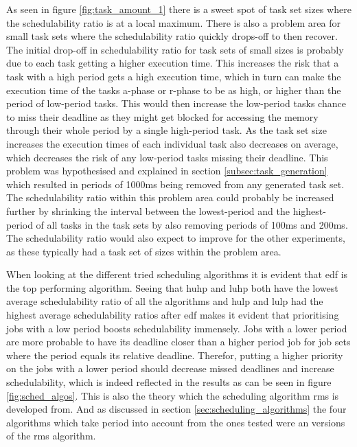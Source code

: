 \documentclass{kththesis}
\begin{document}

As seen in figure \ref{fig:task_amount_1} there is a sweet spot of task set sizes where the
schedulability ratio is at a local maximum. There is also a problem area for small task sets where the
schedulability ratio quickly drops-off to then recover. The initial drop-off in schedulability ratio
for task sets of small sizes is probably due to each task getting a higher execution time. This
increases the risk that a task with a high period gets a high execution time, which in turn can
make the execution time of the tasks \acrshort{a}-phase or \acrshort{r}-phase to be as high,
or higher than the period of low-period tasks. This would then increase the low-period tasks chance
to miss their deadline as they might get blocked for accessing the memory through their whole period
by a single high-period task. As the task set size increases the execution times of each individual
task also decreases on average, which decreases the risk of any low-period tasks missing their
deadline. This problem was hypothesised and explained in section \ref{subsec:task_generation} which
resulted in periods of 1000ms being removed from any generated task set. The schedulability ratio
within this problem area could probably be increased further by shrinking the interval between the
lowest-period and the highest-period of all tasks in the task sets by also removing
periods of 100ms and 200ms. The schedulability ratio would also expect to improve for the other
experiments, as these typically had a task set of sizes within the problem area.


When looking at the different tried scheduling algorithms it is evident that \acrshort{edf} is the
top performing algorithm. Seeing that \acrshort{huhp} and \acrshort{luhp} both have the lowest
average schedulability ratio of all the algorithms and \acrshort{hulp} and \acrshort{lulp} had the
highest average schedulability ratios after \acrshort{edf} makes it evident that prioritising jobs with a
low period boosts schedulability immensely. Jobs with a lower period are more probable to have its
deadline closer than a higher period job for job sets where the period equals its relative deadline.
Therefor, putting a higher priority on the jobs with a lower period should decrease missed deadlines
and increase schedulability, which is indeed reflected in the results as can be seen in figure
\ref{fig:sched_algos}. This is also the theory which the scheduling algorithm \acrshort{rms}
is developed from. And as discussed in section \ref{sec:scheduling_algorithms} the four algorithms
which take period into account from the ones tested were an versions of the \acrshort{rms}
algorithm. 
\end{document}
